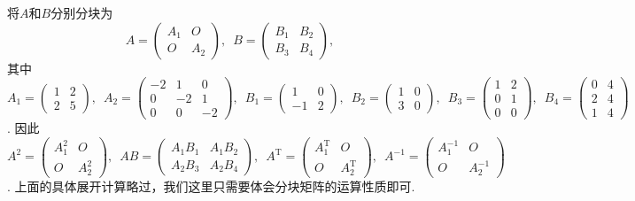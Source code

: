 \begin{solution}
    将$A$和$B$分别分块为
    \[A=\begin{pmatrix}
        A_1 & O \\ O & A_2
    \end{pmatrix},\enspace B=\begin{pmatrix}
        B_1 & B_2 \\ B_3 & B_4
    \end{pmatrix},\]
    其中$A_1=\begin{pmatrix}
        1 & 2 \\ 2 & 5
    \end{pmatrix},\enspace A_2=\begin{pmatrix}
        -2 & 1 & 0 \\ 0 & -2 & 1 \\ 0 & 0 & -2
    \end{pmatrix},\enspace B_1=\begin{pmatrix}
        1 & 0 \\ -1 & 2
    \end{pmatrix},\enspace B_2=\begin{pmatrix}
        1 & 0 \\ 3 & 0
    \end{pmatrix},\enspace B_3=\begin{pmatrix}
        1 & 2 \\ 0 & 1 \\ 0 & 0
    \end{pmatrix},\enspace B_4=\begin{pmatrix}
        0 & 4 \\ 2 & 4 \\ 1 & 4
    \end{pmatrix}$.
    因此$A^2=\begin{pmatrix}
        A_1^2 & O \\ O & A_2^2
    \end{pmatrix},\enspace AB=\begin{pmatrix}
        A_1B_1 & A_1B_2 \\ A_2B_3 & A_2B_4
    \end{pmatrix},\enspace A^\mathrm{T}=\begin{pmatrix}
        A_1^\mathrm{T} & O \\ O & A_2^\mathrm{T}
    \end{pmatrix},\enspace A^{-1}=\begin{pmatrix}
        A_1^{-1} & O \\ O & A_2^{-1}
    \end{pmatrix}$.
    上面的具体展开计算略过，我们这里只需要体会分块矩阵的运算性质即可.
\end{solution}

